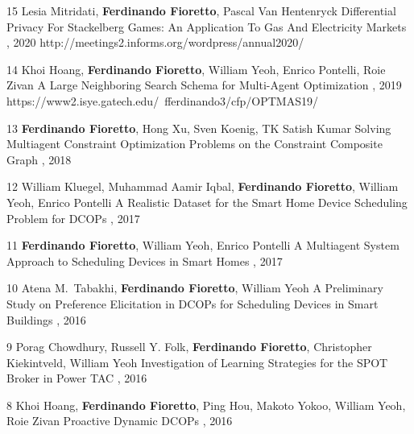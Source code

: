 \begin{pubs}
\wsentry 
	{15} %
	{Lesia Mitridati, {\bf Ferdinando Fioretto}, Pascal Van Hentenryck}
	{Differential Privacy For Stackelberg Games: An Application To Gas And Electricity Markets}
	{, 2020}
	{http://meetings2.informs.org/wordpress/annual2020/}


\wsentry 
	{14} %
	{Khoi Hoang, {\bf Ferdinando Fioretto}, William Yeoh, Enrico Pontelli, Roie Zivan}
	{A Large Neighboring Search Schema for Multi-Agent Optimization} 
	{, 2019}
	{https://www2.isye.gatech.edu/~fferdinando3/cfp/OPTMAS19/}

\wsentry
	{13} %
	{{\bf Ferdinando Fioretto}, Hong Xu, Sven Koenig, TK Satish Kumar}
	{Solving Multiagent Constraint Optimization Problems on the Constraint Composite Graph} 
	{, 2018}
	{~}

\wsentry
	{12} %
	{William Kluegel, Muhammad Aamir Iqbal, {\bf Ferdinando Fioretto}, William Yeoh, Enrico Pontelli}
	{A Realistic Dataset for the Smart Home Device Scheduling Problem for DCOPs}
	{, 
	2017}
	{~}	

\wsentry
	{11} %
	{{\bf Ferdinando Fioretto},  William Yeoh, Enrico Pontelli}
	{A Multiagent System Approach to Scheduling Devices in Smart Homes}
	{, 2017}
	{~}

	\wsentry
	{10} %
	{Atena M.~Tabakhi, {\bf Ferdinando Fioretto}, William Yeoh}
	{A Preliminary Study on Preference Elicitation in DCOPs for Scheduling Devices in Smart Buildings}
	{, 2016}
	{~}

\wsentry 
	{9} %
	{Porag Chowdhury, Russell Y. Folk, {\bf Ferdinando Fioretto}, Christopher Kiekintveld, William Yeoh}
	{Investigation of Learning Strategies for the SPOT Broker in Power TAC}
  	{, 2016}
	{~}

\wsentry 
	{8} %
	{Khoi Hoang, {\bf Ferdinando Fioretto}, Ping Hou, Makoto Yokoo, William Yeoh, Roie Zivan}
	{Proactive Dynamic DCOPs} 
	{, 2016}
	{~}	


\end{pubs}
